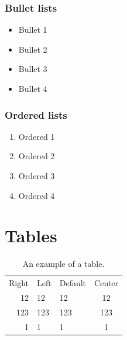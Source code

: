 \documentclass{article}
\begin{document}
\subsubsection{Bullet lists}

\begin{itemize}
\item Bullet 1
\item Bullet 2
\item Bullet 3
\item Bullet 4
\end{itemize}

\subsubsection{Ordered lists}

\begin{enumerate}
\item Ordered 1
\item Ordered 2
\item Ordered 3
\item Ordered 4
\end{enumerate}

\section{Tables}

\begin{table}
	\centering
	\caption{An example of a table.}
	\begin{tabular}{ r l l c }
		Right & Left & Default & Center \\
		12 & 12 & 12 & 12 \\
		123 & 123 & 123 & 123 \\
		1 & 1 & 1 & 1 \\
	\end{tabular}
\end{table}


\end{document}
